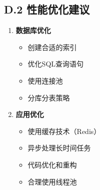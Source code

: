 \subsection*{D.2 性能优化建议}

\begin{enumerate}
\item \textbf{数据库优化}
   \begin{itemize}
   \item 创建合适的索引
   \item 优化SQL查询语句
   \item 使用连接池
   \item 分库分表策略
   \end{itemize}

\item \textbf{应用优化}
   \begin{itemize}
   \item 使用缓存技术（Redis）
   \item 异步处理长时间任务
   \item 代码优化和重构
   \item 合理使用线程池
   \end{itemize}
\end{enumerate}
